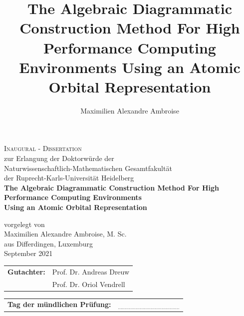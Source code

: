 \documentclass[a4paper,12pt]{book}
\begin{document}
\author{Maximilien Alexandre Ambroise}
\title{The Algebraic Diagrammatic Construction Method For High Performance Computing Environments Using an Atomic Orbital Representation}

\begin{titlepage}
\begin{center}
{\Huge\scshape Inaugural - Dissertation \\}
{ zur Erlangung der Doktorwürde der \\
Naturwissenschaftlich-Mathematischen Gesamtfakultät \\
der Ruprecht-Karls-Universität Heidelberg \\}
\vspace{1cm}
{\huge\bfseries The Algebraic Diagrammatic Construction Method For High Performance Computing Environments \\}
{\Large\bfseries Using an Atomic Orbital Representation \\}
 
\vspace{1.5cm}
{vorgelegt von\\}
\vspace*{1.5cm}
{\Large Maximilien Alexandre Ambroise, M. Sc.}\\
\vspace{1.0cm}
{\large aus Differdingen, Luxemburg}\\
\vspace{2cm}
{September 2021} \\[5pt]
\vspace{2cm}
\end{center}

\begin{tabular}{ll}
{\bfseries Gutachter:} & Prof. Dr. Andreas Dreuw \\
 & Prof. Dr. Oriol Vendrell
\end{tabular}

\vspace{0.8cm}

\begin{tabular}{ll}
{\bfseries Tag der mündlichen Prüfung:} & {$_{.............................................}$}
\end{tabular}

\end{titlepage}


\newpage
\end{document}
